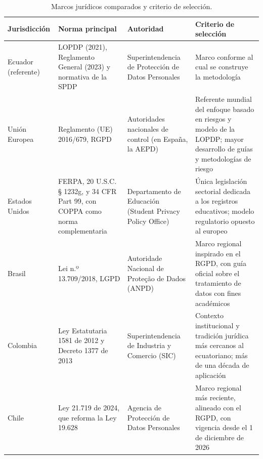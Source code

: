 \begin{table}[htbp]
  \centering
  \caption{Marcos jurídicos comparados y criterio de selección.}
  \label{tab:marcos_seleccion}
  \scriptsize
  \renewcommand{\arraystretch}{1.15}
  \begin{tabularx}{\textwidth}{|>{\raggedright\arraybackslash}p{2.2cm}|>{\raggedright\arraybackslash}p{3.8cm}|>{\raggedright\arraybackslash}p{2.6cm}|L|}
    \hline
    \textbf{Jurisdicción} & \textbf{Norma principal} & \textbf{Autoridad} & \textbf{Criterio de selección} \\
    \hline
    Ecuador (referente) & LOPDP (2021), Reglamento General (2023) y normativa de la SPDP \cite{lopdp2021,rlopdp2023} & Superintendencia de Protección de Datos Personales & Marco conforme al cual se construye la metodología \\ \hline
    Unión Europea & Reglamento (UE) 2016/679, RGPD \cite{rgpd2016} & Autoridades nacionales de control (en España, la AEPD) & Referente mundial del enfoque basado en riesgos y modelo de la LOPDP; mayor desarrollo de guías y metodologías de riesgo \\ \hline
    Estados Unidos & FERPA, 20 U.S.C. § 1232g, y 34 CFR Part 99, con COPPA como norma complementaria \cite{ferpa1974,ferpa34cfr,coppa1998} & Departamento de Educación (Student Privacy Policy Office) & Única legislación sectorial dedicada a los registros educativos; modelo regulatorio opuesto al europeo \\ \hline
    Brasil & Lei n.º 13.709/2018, LGPD \cite{brasil2018lgpd} & Autoridade Nacional de Proteção de Dados (ANPD) & Marco regional inspirado en el RGPD, con guía oficial sobre el tratamiento de datos con fines académicos \cite{anpd2023academicos} \\ \hline
    Colombia & Ley Estatutaria 1581 de 2012 y Decreto 1377 de 2013 \cite{colombia2012ley1581,colombia2013decreto1377} & Superintendencia de Industria y Comercio (SIC) & Contexto institucional y tradición jurídica más cercanos al ecuatoriano; más de una década de aplicación \\ \hline
    Chile & Ley 21.719 de 2024, que reforma la Ley 19.628 \cite{chile2024ley21719} & Agencia de Protección de Datos Personales & Marco regional más reciente, alineado con el RGPD, con vigencia desde el 1 de diciembre de 2026 \\ \hline
  \end{tabularx}
  \raggedright
\end{table}

